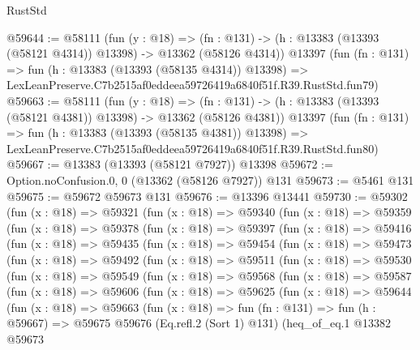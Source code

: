 \begin{lexlean}{RustStd}
\begin{coremodule}
@59644 := @58111
    (fun (y : @18) =>
    (fn : @131) -> (h : @13383 (@13393 (@58121 @4314)) @13398) -> @13362 (@58126 @4314))
    @13397
    (fun (fn : @131) =>
    fun (h : @13383 (@13393 (@58135 @4314)) @13398) =>
    LexLeanPreserve.C7b2515af0eddeea59726419a6840f51f.R39.RustStd.fun79)
@59663 := @58111
    (fun (y : @18) =>
    (fn : @131) -> (h : @13383 (@13393 (@58121 @4381)) @13398) -> @13362 (@58126 @4381))
    @13397
    (fun (fn : @131) =>
    fun (h : @13383 (@13393 (@58135 @4381)) @13398) =>
    LexLeanPreserve.C7b2515af0eddeea59726419a6840f51f.R39.RustStd.fun80)
@59667 := @13383 (@13393 (@58121 @7927)) @13398
@59672 := Option.noConfusion.{0, 0} (@13362 (@58126 @7927)) @131
@59673 := @5461 @131
@59675 := @59672 @59673 @131
@59676 := @13396 @13441
@59730 := @59302
    (fun (x : @18) =>
    @59321
      (fun (x : @18) =>
      @59340
        (fun (x : @18) =>
        @59359
          (fun (x : @18) =>
          @59378
            (fun (x : @18) =>
            @59397
              (fun (x : @18) =>
              @59416
                (fun (x : @18) =>
                @59435
                  (fun (x : @18) =>
                  @59454
                    (fun (x : @18) =>
                    @59473
                      (fun (x : @18) =>
                      @59492
                        (fun (x : @18) =>
                        @59511
                          (fun (x : @18) =>
                          @59530
                            (fun (x : @18) =>
                            @59549
                              (fun (x : @18) =>
                              @59568
                                (fun (x : @18) =>
                                @59587
                                  (fun (x : @18) =>
                                  @59606
                                    (fun (x : @18) =>
                                    @59625
                                      (fun (x : @18) =>
                                      @59644
                                        (fun (x : @18) =>
                                        @59663
                                          (fun (x : @18) =>
                                          fun (fn : @131) =>
                                          fun (h : @59667) =>
                                          @59675
                                            @59676
                                            (Eq.refl.{2} (Sort 1) @131)
                                            (heq_of_eq.{1}
                                              @13382
                                              @59673

\end{coremodule}
\end{lexlean}

